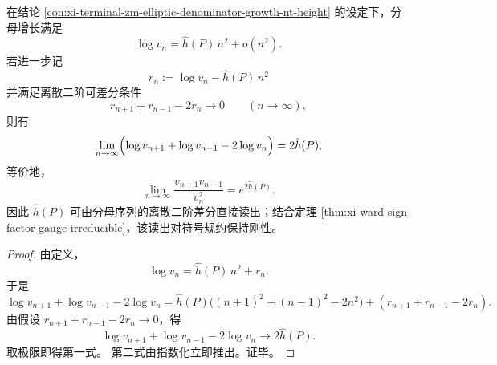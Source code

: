 \begin{corollary}\label{cor:xi-elliptic-denominator-second-difference-height-readout}
在结论 \ref{con:xi-terminal-zm-elliptic-denominator-growth-nt-height} 的设定下，分母增长满足
\[
\log v_n=\hat h(P)\,n^2+o(n^2).
\]
若进一步记
\[
r_n:=\log v_n-\hat h(P)\,n^2
\]
并满足离散二阶可差分条件
\[
r_{n+1}+r_{n-1}-2r_n\to 0\qquad(n\to\infty),
\]
则有
\[
\lim_{n\to\infty}\Bigl(\log v_{n+1}+\log v_{n-1}-2\log v_n\Bigr)=2\hat h(P),
\]
等价地，
\[
\lim_{n\to\infty}\frac{v_{n+1}v_{n-1}}{v_n^2}=e^{2\hat h(P)}.
\]
因此 \(\hat h(P)\) 可由分母序列的离散二阶差分直接读出；结合定理 \ref{thm:xi-ward-sign-factor-gauge-irreducible}，该读出对符号规约保持刚性。
\end{corollary}
\begin{proof}
由定义，
\[
\log v_n=\hat h(P)\,n^2+r_n.
\]
于是
\[
\log v_{n+1}+\log v_{n-1}-2\log v_n
=\hat h(P)\bigl((n+1)^2+(n-1)^2-2n^2\bigr)
+(r_{n+1}+r_{n-1}-2r_n).
\]
由假设 \(r_{n+1}+r_{n-1}-2r_n\to 0\)，得
\[
\log v_{n+1}+\log v_{n-1}-2\log v_n\to 2\hat h(P).
\]
取极限即得第一式。
第二式由指数化立即推出。证毕。
\end{proof}

\endinput
